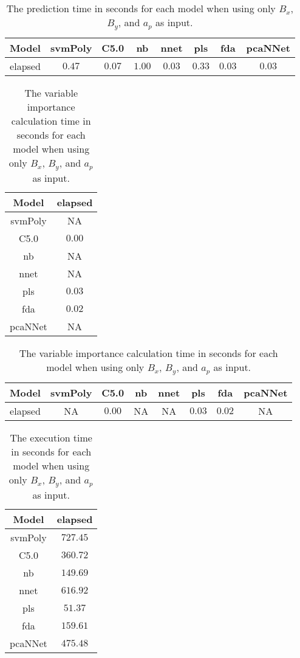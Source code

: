 \begin{table}[!ht]
	\centering
	\begin{tabular}{|c|c|c|c|c|c|c|c|}
		\hline
		Model & svmPoly & C5.0 & nb & nnet & pls & fda & pcaNNet \\ \hline
		elapsed & $0.47$ & $0.07$ & $1.00$ & $0.03$ & $0.33$ & $0.03$ & $0.03$ \\ \hline
	\end{tabular}
	\caption{The prediction time in seconds for each model when using only $B_{x}$, $B_{y}$, and $a_{p}$ as input.}
	\label{tab:time:reverse:xyap:predict}
\end{table}

\begin{table}[!ht]
	\centering
	\begin{tabular}{|c|c|}
		\hline
		Model & elapsed \\ \hline
		svmPoly & NA \\ \hline
		C5.0 & $0.00$ \\ \hline
		nb & NA \\ \hline
		nnet & NA \\ \hline
		pls & $0.03$ \\ \hline
		fda & $0.02$ \\ \hline
		pcaNNet & NA \\ \hline
	\end{tabular}
	\caption{The variable importance calculation time in seconds for each model when using only $B_{x}$, $B_{y}$, and $a_{p}$ as input.}
	\label{tab:time:xyap:importance}
\end{table}

\begin{table}[!ht]
	\centering
	\begin{tabular}{|c|c|c|c|c|c|c|c|}
		\hline
		Model & svmPoly & C5.0 & nb & nnet & pls & fda & pcaNNet \\ \hline
		elapsed & NA & $0.00$ & NA & NA & $0.03$ & $0.02$ & NA \\ \hline
	\end{tabular}
	\caption{The variable importance calculation time in seconds for each model when using only $B_{x}$, $B_{y}$, and $a_{p}$ as input.}
	\label{tab:time:reverse:xyap:importance}
\end{table}

\begin{table}[!ht]
	\centering
	\begin{tabular}{|c|c|}
		\hline
		Model & elapsed \\ \hline
		svmPoly & $727.45$ \\ \hline
		C5.0 & $360.72$ \\ \hline
		nb & $149.69$ \\ \hline
		nnet & $616.92$ \\ \hline
		pls & $51.37$ \\ \hline
		fda & $159.61$ \\ \hline
		pcaNNet & $475.48$ \\ \hline
	\end{tabular}
	\caption{The execution time in seconds for each model when using only $B_{x}$, $B_{y}$, and $a_{p}$ as input.}
	\label{tab:time:xyap:total}
\end{table}

